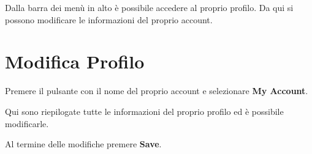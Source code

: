 Dalla barra dei menù in alto è possibile accedere al proprio profilo.
Da qui si possono modificare le informazioni del proprio account.

\section{Modifica Profilo}

Premere il pulsante con il nome del proprio account e selezionare \textbf{My Account}.


\noindent Qui sono riepilogate tutte le informazioni del proprio profilo ed è possibile modificarle.

\noindent Al termine delle modifiche premere \textbf{Save}.